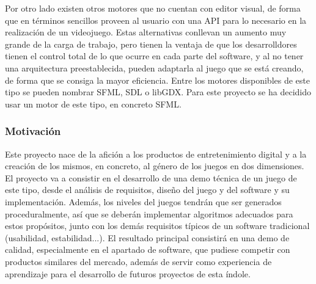 			Por otro lado existen otros motores que no cuentan con editor visual, de forma que en términos sencillos proveen al usuario con una API para lo necesario en la realización de un videojuego. Estas alternativas conllevan un aumento muy grande de la carga de trabajo, pero tienen la ventaja de que los desarrolldores tienen el control total de lo que ocurre en cada parte del software, y al no tener una arquitectura preestablecida, pueden adaptarla al juego que se está creando, de forma que se consiga la mayor eficiencia. Entre los motores disponibles de este tipo se pueden nombrar SFML, SDL o libGDX. Para este proyecto se ha decidido usar un motor de este tipo, en concreto SFML.

		\subsubsection{Motivación}

			Este proyecto nace de la afición a los productos de entretenimiento digital y a la creación de los mismos, en concreto, al género de los juegos en dos dimensiones. El proyecto va a consistir en el desarrollo de una demo técnica de un juego de este tipo, desde el análisis de requisitos, diseño del juego y del software y su implementación. Además, los niveles del juegos tendrán que ser generados proceduralmente, así que se deberán implementar algoritmos adecuados para estos propósitos, junto con los demás requisitos típicos de un software tradicional (usabilidad, estabilidad...). El resultado principal consistirá en una demo de calidad, especialmente en el apartado de software, que pudiese competir con productos similares del mercado, además de servir como experiencia de aprendizaje para el desarrollo de futuros proyectos de esta índole.
